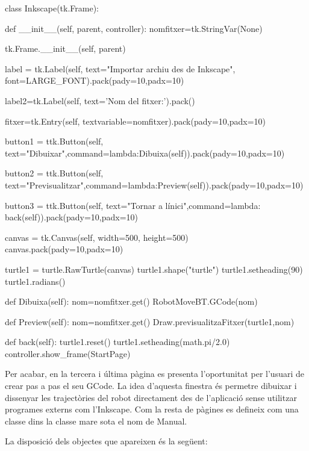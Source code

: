 \begin{python}
	class Inkscape(tk.Frame):
	
	def __init__(self, parent, controller):
	nomfitxer=tk.StringVar(None)
	
	tk.Frame.__init__(self, parent)
	
	
	label = tk.Label(self, text="Importar archiu des de Inkscape", font=LARGE_FONT).pack(pady=10,padx=10)
	
	label2=tk.Label(self, text='Nom del fitxer:').pack()
	
	fitxer=tk.Entry(self, textvariable=nomfitxer).pack(pady=10,padx=10)
	
	button1 = ttk.Button(self, text="Dibuixar",command=lambda:Dibuixa(self)).pack(pady=10,padx=10)
	
	button2 = ttk.Button(self, text="Previsualitzar",command=lambda:Preview(self)).pack(pady=10,padx=10)
	
	button3 = ttk.Button(self, text="Tornar a l\'inici",command=lambda: back(self)).pack(pady=10,padx=10)
	
	canvas = tk.Canvas(self, width=500, height=500)
	canvas.pack(pady=10,padx=10)
	
	turtle1 = turtle.RawTurtle(canvas)
	turtle1.shape("turtle")
	turtle1.setheading(90)
	turtle1.radians()
	
	def Dibuixa(self):
	nom=nomfitxer.get()
	RobotMoveBT.GCode(nom)
	
	def Preview(self):
	nom=nomfitxer.get()
	Draw.previsualitzaFitxer(turtle1,nom)
	
	def back(self):
	turtle1.reset()
	turtle1.setheading(math.pi/2.0)
	controller.show_frame(StartPage)
\end{python}

Per acabar, en la tercera i última pàgina es presenta l'oportunitat per l’usuari de crear pas a pas el seu GCode. La idea d’aquesta finestra és permetre dibuixar i dissenyar les trajectòries del robot directament des de l’aplicació sense utilitzar programes externs com l’Inkscape. Com la resta de pàgines es defineix com una classe dins la classe mare sota el nom de Manual. 

La disposició dels objectes que apareixen és la següent:

